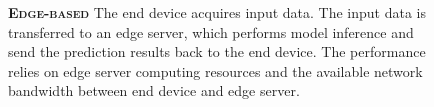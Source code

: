 \begin{figure}
	\begin{minipage}{0.3\linewidth}
		\centering
		\begin{figure}
			\centering
			\captionsetup[subfigure]{justification=centering}
		\end{figure}
	\end{minipage}
	\hfill
	\begin{minipage}{0.65\linewidth}
		\textbf{\protect{} \textsc{Edge-based}}
		\color{caption-color} \newline
		The end device acquires input data. The input data is transferred to an edge server, which performs model inference and send the prediction results back to the end device. The performance relies on edge server computing resources and the available network bandwidth between end device and edge server. 
	\end{minipage}
\end{figure}

